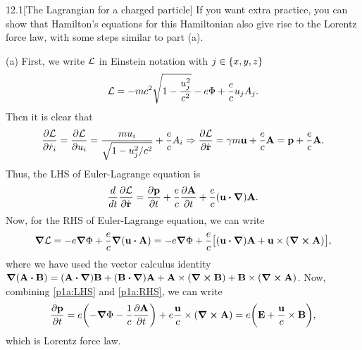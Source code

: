 \documentclass[12pt]{article}
\begin{document}
\begin{problem}{12.1}[The Lagrangian for a charged particle]
If you want extra practice, you can show that Hamilton's equations for this
Hamiltonian also give rise to the Lorentz force law, with some steps similar to
part (a).
\begin{solution}
(a) First, we write $\mathcal{L}$ in Einstein notation with $j\in\qty{x,y,z}$
\begin{equation}
    \mathcal{L}=-mc^2\sqrt{1-\frac{u_j^2}{c^2}}-e\Phi+\frac{e}{c}u_jA_j. 
\end{equation}
Then it is clear that
\begin{equation}\label{p1a:P}
    \frac{\partial\mathcal{L}}{\partial\dot{r}_i}
    =\frac{\partial\mathcal{L}}{\partial u_i}
    =\frac{mu_i}{\sqrt{1-u_j^2/c^2}}+\frac{e}{c}A_i
    \Rightarrow
    \frac{\partial\mathcal{L}}{\partial\dot{\vb{r}}}
    =\gamma m\vb{u}+\frac{e}{c}\vb{A}
    =\vb{p}+\frac{e}{c}\vb{A}.
\end{equation}
Thus, the LHS of Euler-Lagrange equation is
\begin{equation}\label{p1a:LHS}
    \frac{d}{dt}\frac{\partial\LL}{\partial\dot{\vb{r}}}
    =\frac{\partial\vb{p}}{\partial t}
    +\frac{e}{c}\frac{\partial\vb{A}}{\partial t}
    +\frac{e}{c}(\vb{u}\vdot\grad)\vb{A}.
\end{equation}
Now, for the RHS of Euler-Lagrange equation, we can write
\begin{equation}\label{p1a:RHS}
    \grad\LL=-e\grad\Phi+\frac{e}{c}\grad(\vb{u}\vdot\vb{A}) 
    =-e\grad\Phi+\frac{e}{c}\qty[(\vb{u}\vdot\grad)\vb{A}+\vb{u}\times(\curl{\vb{A}})],
\end{equation}
where we have used the vector calculus identity
$\grad(\vb{A}\vdot\vb{B})=(\vb{A}\vdot\grad)\vb{B}+(\vb{B}\vdot\grad)\vb{A}+\vb{A}\times(\curl{\vb{B}})+\vb{B}\times(\curl{\vb{A}})$.
Now, combining \eqref{p1a:LHS} and \eqref{p1a:RHS}, we can write
\begin{equation}
    \frac{\partial\vb{p}}{\partial t}
    =e\qty(-\grad\Phi-\frac1c\frac{\partial\vb{A}}{\partial t})
    +e\frac{\vb{u}}{c}\times(\curl{\vb{A}})
    =e\qty(\vb{E}+\frac{\vb{u}}{c}\times\vb{B}),
\end{equation}
which is Lorentz force law.


\end{solution}
\end{problem}
\end{document}
